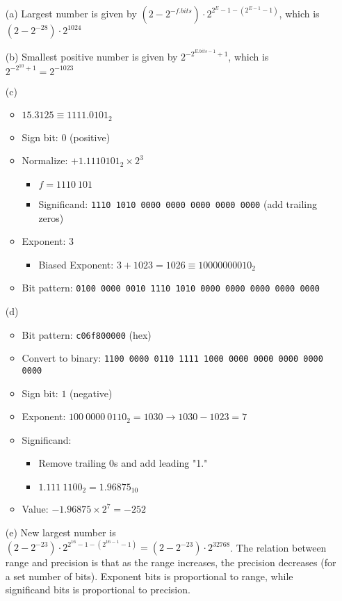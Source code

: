 \documentclass{article}
\begin{document}
\begin{enumerate}
    \item[(a)] Largest number is given by $(2-2^{-f.bits}) \cdot 2^{2^{E}-1-(2^{E-1}-1)}$, which is $(2-2^{-28}) \cdot 2^{1024}$
    \item[(b)] Smallest positive number is given by $2^{-2^{E.bits-1}+1}$, which is $2^{-2^{10}+1} = 2^{-1023}$
    \item[(c)] \begin{itemize}
            \item $15.3125 \equiv 1111.0101_2$
            \item Sign bit: $0$ (positive)
            \item Normalize: $+1.1110101_2 \times 2^3$
                  \begin{itemize}
                      \item $f=1110\ 101$
                      \item Significand: \texttt{1110 1010 0000 0000 0000 0000 0000} (add trailing zeros)
                  \end{itemize}
            \item Exponent: 3
                  \begin{itemize}
                      \item Biased Exponent: $3+1023=1026 \equiv 10000000010_2$
                  \end{itemize}
            \item Bit pattern: \texttt{0100 0000 0010 1110 1010 0000 0000 0000 0000 0000}
        \end{itemize}
    \item[(d)]
        \begin{itemize}
            \item Bit pattern: \texttt{c06f800000} (hex)
            \item Convert to binary: \texttt{1100 0000 0110 1111 1000 0000 0000 0000 0000 0000}
            \item Sign bit: $1$ (negative)
            \item Exponent: $100\ 0000\ 0110_2 = 1030 \rightarrow 1030 - 1023 = 7$
            \item Significand:
                  \begin{itemize}
                      \item Remove trailing 0s and add leading "1."
                      \item $1.111\ 1100_2 = 1.96875_{10}$
                  \end{itemize}
            \item Value: $-1.96875 \times 2^7 = -252$
        \end{itemize}
    \item[(e)] New largest number is $(2-2^{-23}) \cdot 2^{2^{16}-1-(2^{16-1}-1)} = (2-2^{-23}) \cdot 2^{32768}$. The relation between range and precision is that as the range increases, the precision decreases (for a set number of bits). Exponent bits is proportional to range, while significand bits is proportional to precision.
\end{enumerate}
\end{document}
